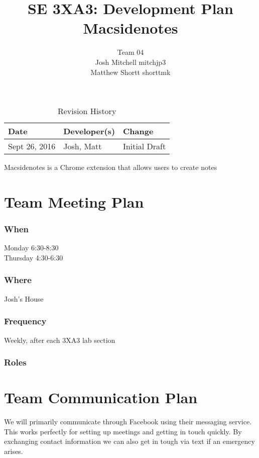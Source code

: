 \documentclass{article}
\title{SE 3XA3: Development Plan\\Macsidenotes}
\author{Team 04
	\\ Josh Mitchell mitchjp3
	\\ Matthew Shortt shorttmk
}
\date{}
\begin{document}
	
	\begin{table}[hp]
		\caption{Revision History} \label{TblRevisionHistory}
		\begin{tabularx}{\textwidth}{llX}
			\toprule
			\textbf{Date} & \textbf{Developer(s)} & \textbf{Change}\\
			\midrule
			Sept 26, 2016 & Josh, Matt & Initial Draft\\
			\bottomrule
		\end{tabularx}
	\end{table}
	
	\newpage
	
	\maketitle
	
	Macsidenotes is a Chrome extension that allows users to create notes
	
	\section{Team Meeting Plan}
	\subsubsection*{When}
	Monday 6:30-8:30 \\
	Thursday 4:30-6:30
	\subsubsection*{Where}
	Josh's House
	\subsubsection*{Frequency}
	Weekly, after each 3XA3 lab section
	\subsubsection*{Roles}
	
	
	\section{Team Communication Plan}
	
	We will primarily communicate through Facebook using their messaging service. This 
	works perfectly for setting up meetings and getting in touch quickly. By exchanging 
	contact information we can also get in tough via text if an emergency arises. 
	
\end{document}
